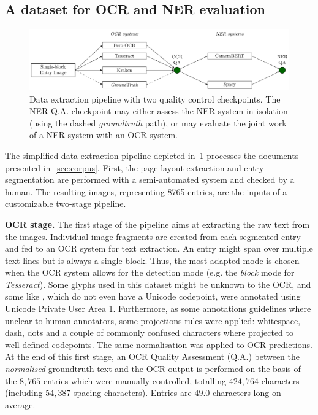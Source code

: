 \subsection{A dataset for OCR and NER evaluation}
\label{sec:dataset-for-eval}

\begin{figure}[tb]
    \includegraphics[width=\linewidth]{figs/protocol.pdf}
    \caption{Data extraction pipeline with two quality control checkpoints. The
    NER Q.A. checkpoint may either assess the NER system in isolation (using the dashed
    \emph{groundtruth} path), or may evaluate the joint work of a NER
    system with an OCR system.}
    \label{fig.pipeline}
\end{figure}


The simplified data extraction pipeline depicted in~\cref{fig.pipeline} processes the documents presented
in~\cref{sec:corpus}. First, the page layout extraction and entry segmentation are performed with a
semi-automated system and checked by a human. The resulting images, representing 8765 entries, are the inputs of a customizable two-stage pipeline.

\textbf{OCR stage.} The first stage of the pipeline aims at extracting the raw text from the images. 
Individual image fragments are created from each segmented entry and fed to an OCR system for text extraction.
An entry might span over multiple text lines but is
always a single block. Thus, the most adapted mode is chosen when the OCR system allows for the detection mode (e.g. the
\emph{block} mode for \emph{Tesseract}). 
Some glyphs used in this dataset might be unknown to the OCR, and some like
, which do not even have a Unicode codepoint, were annotated using Unicode Private User Area 1.
Furthermore, as some annotations guidelines where unclear to human annotators, some projections rules were applied: whitespace, dash, dots and a couple of commonly confused characters where projected to well-defined codepoints.
The same normalisation was applied to OCR predictions.
At the end of this first stage, an OCR Quality Assessment (Q.A.) between the \emph{normalised} groundtruth text and the
OCR output is performed on the basis of the $8,765$ entries which were manually controlled, totalling $424,764$ characters (including $54,387$ spacing characters). Entries are $49.0$-characters long on average.


